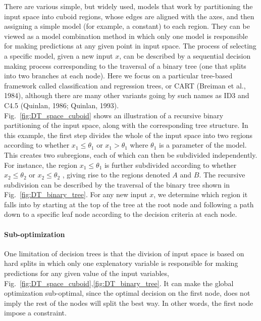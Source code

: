 \documentclass[final, paper=letter,5p,times,twocolumn]{elsarticle}
\begin{document}
There are various simple, but widely used, models that work by partitioning the input space into cuboid regions, whose edges are aligned with the axes, and then assigning a simple model (for example, a constant) to each region. They can be viewed as a model combination method in which only one model is responsible for making predictions at any given point in input space. The process of selecting a specific model, given a new input $x$, can be described by a sequential decision making process corresponding to the traversal of a binary tree (one that splits into two branches at each node). Here we focus on a particular tree-based framework called classification and regression trees, or CART (Breiman et al., 1984), although there are many other variants going by such names as ID3 and C4.5 (Quinlan, 1986; Quinlan, 1993). \\

Fig.~\ref{fig:DT_space_cuboid} shows an illustration of a recursive binary partitioning of the input space, along with the corresponding tree structure. In this example, the first step divides the whole of the input space into two regions according to whether $x_{1} \le \theta_{1}$ or $x_{1} > \theta_{1}$ where $\theta_{1}$ is a parameter of the model. This creates two subregions, each of which can then be subdivided independently. For instance, the region $x_{1} \le \theta_{1}$ is further subdivided according to whether $x_{2} \le \theta_{2}$ or $x_{2} \le \theta_{2}$ , giving rise to the regions denoted $A$ and $B$. The recursive subdivision can be described by the traversal of the binary tree shown in Fig.~\ref{fig:DT_binary_tree}. For any new input $x$, we determine which region it falls into by starting at the top of the tree at the root node and following a path down to a specific leaf node according to the decision criteria at each node.

\paragraph{Sub-optimization}{One limitation of decision trees is that the division of input space is based on hard splits in which only one explenatory variable is responsible for making predictions for any given value of the input variables, Fig.~\ref{fig:DT_space_cuboid},\ref{fig:DT_binary_tree}. It can make the global optimization sub-optimal, since the optimal decision on the first node, does not imply the rest of the nodes will split the best way. In other words, the first node impose a constraint. }
\end{document}
